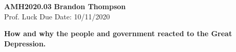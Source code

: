 \noindent
\textbf{AMH2020.03} \hfill \textbf{Brandon Thompson} \\
\normalsize Prof. Luck \hfill Due Date: 10/11/2020 \\

\begin{center}
\textbf{How and why the people and government reacted to the Great Depression.}
\end{center}